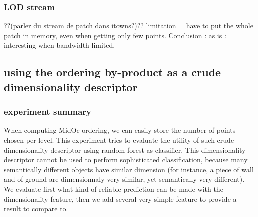 		\subsubsection{LOD stream}
			??(parler du stream de patch dans itowns?)??
			limitation = have to put the whole patch in memory, even when getting only few points.
			Conclusion : as is : interesting when bandwidth limited.  
			
			
	\subsection{using the ordering by-product as a crude dimensionality descriptor}
		\subsubsection{experiment summary}
			When computing MidOc ordering, we can easily store the number of points chosen per level.
			This experiment tries to evaluate the utility of such crude dimensionality descriptor using random forest as classifier.
			This dimensionality descriptor cannot be used to perform sophisticated classification, because many semantically different objects have similar dimension (for instance, a piece of wall and of ground are dimensionnaly very similar, yet semantically very different).
			We evaluate first what kind of reliable prediction can be made with the dimensionality feature,
			then we add several very simple feature to provide a result to compare to.  
		\subsubsection{}
		
 